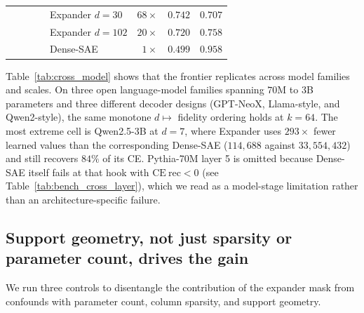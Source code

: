 \documentclass{article}
\theoremstyle{plain}
\theoremstyle{definition}
\theoremstyle{remark}
\begin{document}
\begin{table}[h]
\begin{tabular}{llrrlrrr}
                                      &                       &                         &                                & Expander $d{=}30$   & $68\times$  & $0.742$        & $0.707$ \\
                                      &                       &                         &                                & Expander $d{=}102$  & $20\times$  & $0.720$        & $0.758$ \\
                                      &                       &                         &                                & Dense-SAE           & $1\times$   & $0.499$        & $0.958$ \\
        \bottomrule
    \end{tabular}
\end{table}


Table~\ref{tab:cross_model} shows that the frontier replicates across model families and scales.
%
On three open language-model families spanning $70$M to $3$B parameters and three different decoder designs (GPT-NeoX, Llama-style, and Qwen2-style), the same monotone $d \mapsto$ fidelity ordering holds at $k{=}64$.
%
The most extreme cell is Qwen2.5-3B at $d{=}7$, where Expander uses $293\times$ fewer learned values than the corresponding Dense-SAE ($114{,}688$ against $33{,}554{,}432$) and still recovers $84\%$ of its CE.
%
Pythia-70M layer 5 is omitted because Dense-SAE itself fails at that hook with $\mathrm{CE\ rec} < 0$ (see Table~\ref{tab:bench_cross_layer}), which we read as a model-stage limitation rather than an architecture-specific failure.



\subsection{Support geometry, not just sparsity or parameter count, drives the gain}
\label{sec:exp_controls}

We run three controls to disentangle the contribution of the expander mask from confounds with parameter count, column sparsity, and support geometry.
\end{document}
